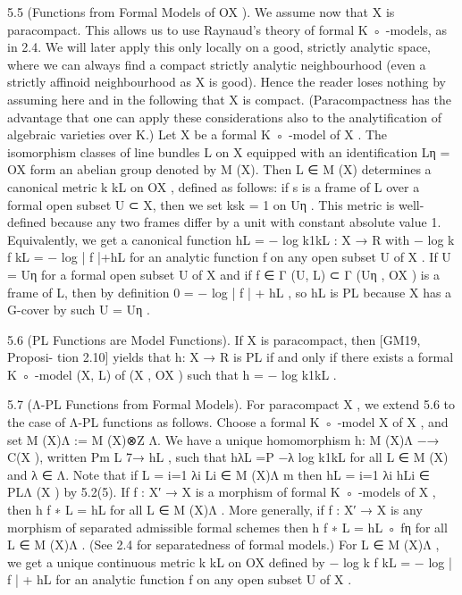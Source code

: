 \documentclass[
  10pt,
]{article}
\newenvironment{Shaded}{}{}
\newcommand{\NormalTok}[1]{#1}
\begin{document}
\begin{Shaded}
\begin{Highlighting}[]
\NormalTok{5.5 (Functions from Formal Models of OX ). We assume now that X is paracompact. This}
\NormalTok{allows us to use Raynaud’s theory of formal K ◦ {-}models, as in 2.4. We will later apply}
\NormalTok{this only locally on a good, strictly analytic space, where we can always find a compact}
\NormalTok{strictly analytic neighbourhood (even a strictly affinoid neighbourhood as X is good).}
\NormalTok{Hence the reader loses nothing by assuming here and in the following that X is compact.}
\NormalTok{(Paracompactness has the advantage that one can apply these considerations also to the}
\NormalTok{analytification of algebraic varieties over K.)}
\NormalTok{   Let X be a formal K ◦ {-}model of X . The isomorphism classes of line bundles L on X}
\NormalTok{equipped with an identification Lη = OX form an abelian group denoted by M (X). Then}
\NormalTok{L ∈ M (X) determines a canonical metric k kL on OX , defined as follows: if s is a frame of}
\NormalTok{L over a formal open subset U ⊂ X, then we set ksk = 1 on Uη . This metric is well{-}defined}
\NormalTok{because any two frames differ by a unit with constant absolute value 1.}
\NormalTok{   Equivalently, we get a canonical function hL = − log k1kL : X → R with − log k f kL =}
\NormalTok{− log | f |+hL for an analytic function f on any open subset U of X . If U = Uη for a formal}
\NormalTok{open subset U of X and if f ∈ Γ (U, L) ⊂ Γ (Uη , OX ) is a frame of L, then by definition}
\NormalTok{0 = − log | f | + hL , so hL is PL because X has a G{-}cover by such U = Uη .}

\NormalTok{5.6 (PL Functions are Model Functions). If X is paracompact, then [GM19, Proposi{-}}
\NormalTok{tion 2.10] yields that h: X → R is PL if and only if there exists a formal K ◦ {-}model (X, L)}
\NormalTok{of (X , OX ) such that h = − log k1kL .}

\NormalTok{5.7 (Λ{-}PL Functions from Formal Models). For paracompact X , we extend 5.6 to the}
\NormalTok{case of Λ{-}PL functions as follows. Choose a formal K ◦ {-}model X of X , and set M (X)Λ :=}
\NormalTok{M (X)⊗Z Λ. We have a unique homomorphism h: M (X)Λ −→ C(X ), written        Pm L 7→ hL , such}
\NormalTok{that hλL =P   −λ log k1kL for all L ∈ M (X) and λ ∈ Λ. Note that if L = i=1 λi Li ∈ M (X)Λ}
\NormalTok{                m}
\NormalTok{then hL = i=1 λi hLi ∈ PLΛ (X ) by 5.2(5).}
\NormalTok{   If f : X′ → X is a morphism of formal K ◦ {-}models of X , then h f ∗ L = hL for all L ∈ M (X)Λ .}
\NormalTok{More generally, if f : X′ → X is any morphism of separated admissible formal schemes}
\NormalTok{then h f ∗ L = hL ◦ fη for all L ∈ M (X)Λ . (See 2.4 for separatedness of formal models.)}
\NormalTok{   For L ∈ M (X)Λ , we get a unique continuous metric k kL on OX defined by − log k f kL =}
\NormalTok{− log | f | + hL for an analytic function f on any open subset U of X .}


\end{Highlighting}
\end{Shaded}
\end{document}
